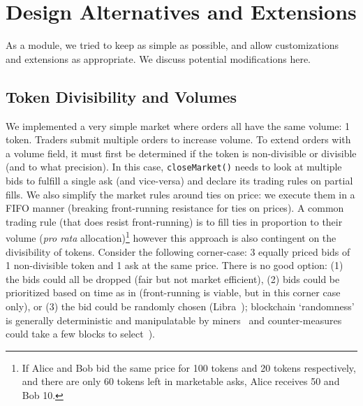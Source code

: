 
\section{Design Alternatives and Extensions}


As a module, we tried to keep \cm as simple as possible, and allow customizations and extensions as appropriate. We discuss potential modifications here.  

\subsection{Token Divisibility and Volumes} 



We implemented a very simple market where orders all have the same volume: 1 token. Traders submit multiple orders to increase volume. To extend orders with a volume field, it must first be determined if the token is non-divisible or divisible (and to what precision). In this case, \texttt{closeMarket()} needs to look at multiple bids to fulfill a single ask (and vice-versa) and declare its trading rules on partial fills. We also simplify the market rules around ties on price: we execute them in a FIFO manner (breaking front-running resistance for ties on prices). A common trading rule (that does resist front-running) is to fill ties in proportion to their volume (\ie \textit{pro rata} allocation)\footnote{If Alice and Bob bid the same price for 100 tokens and 20 tokens respectively, and there are only 60 tokens left in marketable asks, Alice receives 50 and Bob 10.} however this approach is also contingent on the divisibility of tokens. Consider the following corner-case: 3 equally priced bids of 1 non-divisible token and 1 ask at the same price. There is no good option: (1) the bids could all be dropped (fair but not market efficient), (2) bids could be prioritized based on time as in \cm (front-running is viable, but in this corner case only), or (3) the bid could be randomly chosen (\cf Libra~\cite{mavroudis2019libra}); blockchain `randomness' is generally deterministic and manipulatable by miners~\cite{bonneau2015random,buenz2017proofs} and counter-measures could take a few blocks to select~\cite{boneh2018verifiable}).

